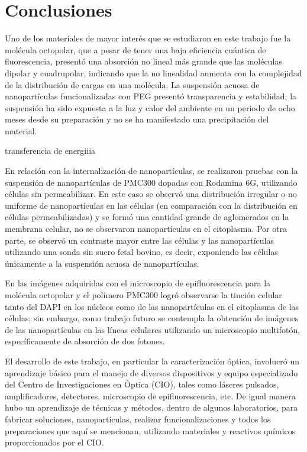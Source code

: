 \chapter{Conclusiones}   %


Uno de los materiales de mayor inter\'es que se estudiaron en este trabajo fue la mol\'ecula octopolar, que a pesar de tener una baja eficiencia cu\'antica de fluorescencia, present\'o una absorci\'on no lineal m\'as grande que las mol\'eculas dipolar y cuadrupolar, indicando que la no linealidad aumenta con la complejidad de la distribuci\'on de cargas en una mol\'ecula. La suspensi\'on acuosa de nanopart\'iculas funcionalizadas con PEG present\'o transparencia y estabilidad; la suspensi\'on ha sido expuesta a la luz y calor del ambiente en un periodo de ocho meses desde su preparaci\'on y no se ha manifestado una precipitaci\'on del material. 



transferencia de energiiia



En relaci\'on con la internalizaci\'on de nanopart\'iculas, se realizaron pruebas con la suspensi\'on de nanopart\'iculas de PMC300 dopadas con Rodamina 6G, utilizando c\'elulas sin permeabilizar. En este caso se observ\'o una distribuci\'on irregular o no uniforme de nanopart\'iculas en las c\'elulas (en comparaci\'on con la distribuci\'on en c\'elulas permeabilizadas) y se form\'o una cantidad grande de aglomerados en la membrana celular, no se observaron nanopart\'iculas en el citoplasma. Por otra parte, se observ\'o un contraste mayor entre las c\'elulas y las nanopart\'iculas utilizando una sonda sin suero fetal bovino, es decir, exponiendo las c\'elulas \'unicamente a la suspensi\'on acuosa de nanopart\'iculas.


En las im\'agenes adquiridas con el microscopio de epifluorescencia para la mol\'ecula octopolar y el pol\'imero PMC300 logr\'o observarse la tinci\'on celular tanto del DAPI en los n\'ucleos como de las nanopart\'iculas en el citoplasma de las c\'elulas; sin embargo, como trabajo futuro se contempla la obtenci\'on de im\'agenes de las nanopart\'iculas en las l\'ineas celulares utilizando un microscopio multifot\'on, espec\'ificamente de absorci\'on de dos fotones.           

El desarrollo de este trabajo, en particular la caracterizaci\'on \'optica, involucr\'o un aprendizaje b\'asico para el manejo de diversos dispositivos y equipo especializado del Centro de Investigaciones en \'Optica (CIO), tales como l\'aseres pulsados, amplificadores, detectores, microscopio de epifluorescencia, etc. De igual manera hubo un aprendizaje de t\'ecnicas y m\'etodos, dentro de algunos laboratorios, para fabricar soluciones, nanopart\'iculas, realizar funcionalizaciones y todos los preparaciones que aqu\'i se mencionan, utilizando materiales y reactivos qu\'imicos proporcionados por el CIO.  









